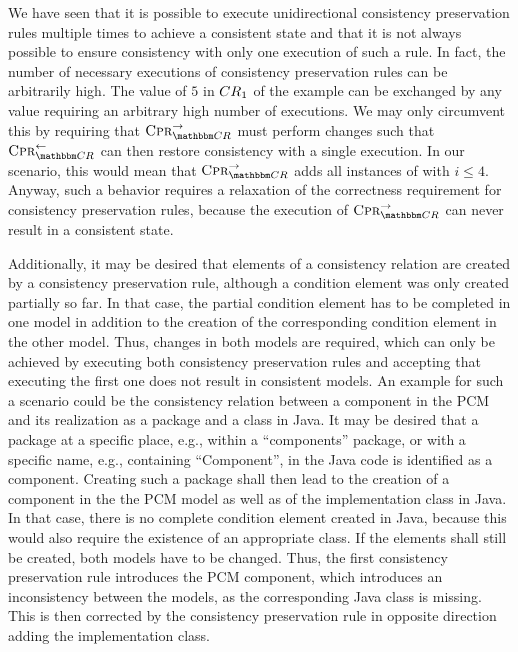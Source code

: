 We have seen that it is possible to execute unidirectional consistency preservation rules multiple times to achieve a consistent state and that it is not always possible to ensure consistency with only one execution of such a rule.
In fact, the number of necessary executions of consistency preservation rules can be arbitrarily high.
The value of $5$ in $\consistencyrelation{CR}{1}$ of the example can be exchanged by any value requiring an arbitrary high number of executions.
We may only circumvent this by requiring that $\consistencypreservationrule{\consistencyrelationset{CR}}^{\rightarrow}$ must perform changes such that $\consistencypreservationrule{\consistencyrelationset{CR}}^{\leftarrow}$ can then restore consistency with a single execution.
In our scenario, this would mean that $\consistencypreservationrule{\consistencyrelationset{CR}}^{\rightarrow}$ adds all instances of  with $i \leq 4$.
Anyway, such a behavior requires a relaxation of the correctness requirement for consistency preservation rules, because the execution of $\consistencypreservationrule{\consistencyrelationset{CR}}^{\rightarrow}$ can never result in a consistent state.

Additionally, it may be desired that elements of a consistency relation are created by a consistency preservation rule, although a condition element was only created partially so far.
In that case, the partial condition element has to be completed in one model in addition to the creation of the corresponding condition element in the other model.
Thus, changes in both models are required, which can only be achieved by executing both consistency preservation rules and accepting that executing the first one does not result in consistent models.
An example for such a scenario could be the consistency relation between a component in the \gls{PCM} and its realization as a package and a class in Java.
It may be desired that a package at a specific place, e.g., within a \enquote{components} package, or with a specific name, e.g., containing \enquote{Component}, in the Java code is identified as a component.
Creating such a package shall then lead to the creation of a component in the the \gls{PCM} model as well as of the implementation class in Java.
In that case, there is no complete condition element created in Java, because this would also require the existence of an appropriate class.
If the elements shall still be created, both models have to be changed.
Thus, the first consistency preservation rule introduces the \gls{PCM} component, which introduces an inconsistency between the models, as the corresponding Java class is missing.
This is then corrected by the consistency preservation rule in opposite direction adding the implementation class.


